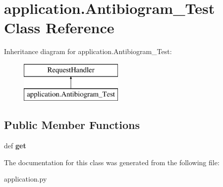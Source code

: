 \hypertarget{classapplication_1_1_antibiogram___test}{\section{application.\-Antibiogram\-\_\-\-Test Class Reference}
\label{classapplication_1_1_antibiogram___test}
}
Inheritance diagram for application.\-Antibiogram\-\_\-\-Test\-:\begin{figure}[H]
\begin{center}
\leavevmode
\includegraphics[height=2.000000cm]{classapplication_1_1_antibiogram___test}
\end{center}
\end{figure}
\subsection*{Public Member Functions}
\begin{DoxyCompactItemize}
\item 
\hypertarget{classapplication_1_1_antibiogram___test_a06711a7a27b3885db2353b098c18fdb2}{def {\bfseries get}}\label{classapplication_1_1_antibiogram___test_a06711a7a27b3885db2353b098c18fdb2}

\end{DoxyCompactItemize}


The documentation for this class was generated from the following file\-:\begin{DoxyCompactItemize}
\item 
application.\-py\end{DoxyCompactItemize}
